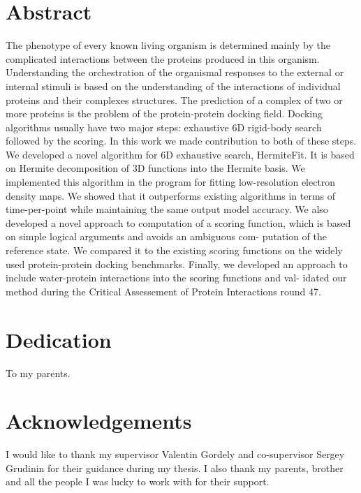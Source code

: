 \documentclass[12pt,twoside]{report}
\begin{document}
\MakeUGthesePDG    %



\chapter*{Abstract}
The phenotype of every known living organism is determined mainly by the complicated interactions between the proteins produced in this organism. Understanding
the orchestration of the organismal responses to the external or internal stimuli is based on the understanding of the interactions of individual proteins
and their complexes structures. The prediction of a complex of two or more proteins is the problem of the protein-protein docking field. Docking algorithms 
usually have two major steps: exhaustive 6D rigid-body search followed by the scoring. In this work we made contribution to both of these steps. 
We developed a novel algorithm for 6D exhaustive search, HermiteFit. It is based on Hermite decomposition of 3D functions into the Hermite basis. 
We implemented this algorithm in the program for fitting low-resolution electron density maps. We showed that it outperforms existing algorithms 
in terms of time-per-point while maintaining the same output model accuracy. We also developed a novel approach to computation of a scoring function, 
which is based on simple logical arguments and avoids an ambiguous com- putation of the reference state. We compared it to the existing scoring functions 
on the widely used protein-protein docking benchmarks. Finally, we developed an approach to include water-protein interactions into the scoring functions 
and val- idated our method during the Critical Assessement of Protein Interactions round 47. 

\chapter*{Dedication}
To my parents.

\chapter*{Acknowledgements}
I would like to thank my supervisor Valentin Gordely and co-supervisor Sergey Grudinin for their guidance during my thesis. I also thank my parents, brother and all the people
I was lucky to work with for their support.

\listoffigures 
\newpage
\listoftables
\newpage
\end{document}

